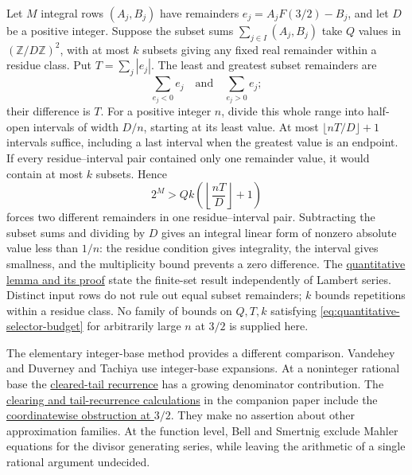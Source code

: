 \documentclass[11pt]{article}
\newcommand{\shortrecordlink}[3]{\href{#1\##2}{#3}}
\begin{document}
Let $M$ integral rows $(A_j,B_j)$ have remainders
$e_j=A_jF(3/2)-B_j$, and let $D$ be a positive integer.
Suppose the subset sums $\sum_{j\in I}(A_j,B_j)$ take $Q$ values in
$(\mathbb Z/D\mathbb Z)^2$, with at most $k$ subsets giving any
fixed real remainder within a residue class. Put $T=\sum_j|e_j|$.
The least and greatest subset remainders are
\[
 \sum_{e_j<0}e_j\quad\text{and}\quad\sum_{e_j>0}e_j;
\]
their difference is $T$. For a positive integer $n$, divide this
whole range into half-open intervals of width $D/n$, starting at
its least value. At most $\lfloor nT/D\rfloor+1$ intervals suffice,
including a last interval when the greatest value is an endpoint.
If every residue--interval pair contained only one remainder value,
it would contain at most $k$ subsets. Hence
\begin{equation}\label{eq:quantitative-selector-budget}
 2^M>Qk\left(\left\lfloor\frac{nT}{D}\right\rfloor+1\right)
\end{equation}
forces two different remainders in one residue--interval pair.
Subtracting the subset sums and dividing by $D$ gives an integral
linear form of nonzero absolute value less than $1/n$: the residue
condition gives integrality, the interval gives smallness, and the
multiplicity bound prevents a zero difference. The
\shortrecordlink{erdos1049-rational-base-lambert-reasoning-surface.pdf}
{long1049-selectors}{quantitative lemma and its proof}
state the finite-set result independently of Lambert series.
Distinct input rows do not rule out equal subset remainders; $k$
bounds repetitions within a residue class. No family of bounds on
$Q,T,k$ satisfying \eqref{eq:quantitative-selector-budget} for
arbitrarily large $n$ at $3/2$ is supplied here.

The elementary integer-base method provides a different comparison.
Vandehey \cite{vandehey2013} and Duverney and Tachiya
\cite{duverneytachiya2019} use integer-base expansions. At a
noninteger rational base the
\href{https://github.com/wcook04/plectis-erdos/blob/7380b7871687b6bcc41ca0143c61f232e8af6500/lean/ErdosProblems/Erdos1049/RationalBaseLambert.lean\#L187}{cleared-tail recurrence}
has a growing denominator contribution. The
\shortrecordlink{erdos1049-rational-base-lambert-reasoning-surface.pdf}
{long1049-clearing}{clearing and tail-recurrence calculations}
in the companion paper include the
\href{https://github.com/wcook04/plectis-erdos/blob/7380b7871687b6bcc41ca0143c61f232e8af6500/lean/ErdosProblems/Erdos1049/RationalBaseLambert.lean\#L155}{coordinatewise obstruction at $3/2$}.
They make no assertion about other approximation families. At the
function level, Bell and Smertnig \cite[Theorem~1.3]{bellsmertnig2026}
exclude Mahler equations for the divisor generating series, while
leaving the arithmetic of a single rational argument undecided.
\end{document}
